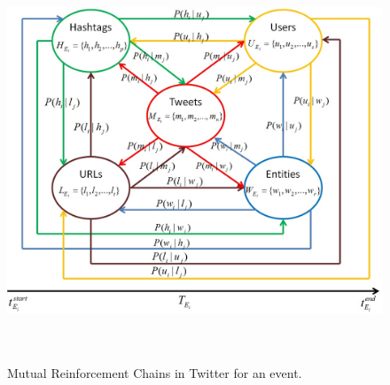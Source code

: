 \begin{figure}[htbp]
  
  \centering
\caption{\small Mutual Reinforcement Chains in Twitter for an event.}    
\includegraphics[width=16cm,height=12cm]{Figures/TwitterEventInfoGraph.jpg}
    
    \label{mrc}
\end{figure}

